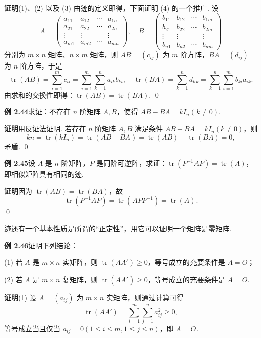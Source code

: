 \documentclass[UTF8,12pt,a4paper,fontset=fandol]{ctexart}
\begin{document}
\noindent\textbf{证明}\quad (1)、(2) 以及 (3) 由迹的定义即得，下面证明 (4) 的一个推广. 设
\[
A=
\left(
\begin{array}{cccc}
a_{11} & a_{12} & \cdots & a_{1n}\\
a_{21} & a_{22} & \cdots & a_{2n}\\
\vdots & \vdots & & \vdots\\
a_{m1} & a_{m2} & \cdots & a_{mn}
\end{array}
\right),\quad
B=
\left(
\begin{array}{cccc}
b_{11} & b_{12} & \cdots & b_{1m}\\
b_{21} & b_{22} & \cdots & b_{2m}\\
\vdots & \vdots & & \vdots\\
b_{n1} & b_{n2} & \cdots & b_{nm}
\end{array}
\right)
\]
分别为 $m\times n$ 矩阵、$n\times m$ 矩阵，则 $AB=(c_{ij})$ 为 $m$ 阶方阵，$BA=(d_{ij})$ 为 $n$ 阶方阵，于是
\[
\operatorname{tr}(AB)=\sum_{i=1}^m c_{ii}
=\sum_{i=1}^m\sum_{k=1}^n a_{ik}b_{ki},\quad
\operatorname{tr}(BA)=\sum_{k=1}^n d_{kk}
=\sum_{k=1}^n\sum_{i=1}^m b_{ki}a_{ik}.
\]
由求和的交换性即得：$\operatorname{tr}(AB)=\operatorname{tr}(BA)$. \qed

\noindent\textbf{例 2.44}\quad 求证：不存在 $n$ 阶矩阵 $A,B$，使得 $AB-BA=kI_n(k\ne0)$.

\noindent\textbf{证明}\quad 用反证法证明. 若存在 $n$ 阶矩阵 $A,B$ 满足条件 $AB-BA=kI_n(k\ne0)$，则
\[
kn=\operatorname{tr}(kI_n)=\operatorname{tr}(AB-BA)=\operatorname{tr}(AB)-\operatorname{tr}(BA)=0,
\]
矛盾. \qed

\noindent\textbf{例 2.45}\quad 设 $A$ 是 $n$ 阶矩阵，$P$ 是同阶可逆阵，求证：$\operatorname{tr}(P^{-1}AP)=\operatorname{tr}(A)$，即相似矩阵具有相同的迹.

\noindent\textbf{证明}\quad 因为 $\operatorname{tr}(AB)=\operatorname{tr}(BA)$，故
\[
\operatorname{tr}(P^{-1}AP)=\operatorname{tr}(APP^{-1})=\operatorname{tr}(A).
\]
\qed

迹还有一个基本性质是所谓的“正定性”，用它可以证明一个矩阵是零矩阵.

\noindent\textbf{例 2.46}\quad 证明下列结论：

(1) 若 $A$ 是 $m\times n$ 实矩阵，则 $\operatorname{tr}(AA')\ge0$，等号成立的充要条件是 $A=O$；

(2) 若 $A$ 是 $m\times n$ 复矩阵，则 $\operatorname{tr}(A\overline A')\ge0$，等号成立的充要条件是 $A=O$.

\noindent\textbf{证明}\quad (1) 设 $A=(a_{ij})$ 为 $m\times n$ 实矩阵，则通过计算可得
\[
\operatorname{tr}(AA')=\sum_{i=1}^m\sum_{j=1}^n a_{ij}^2\ge0,
\]
等号成立当且仅当 $a_{ij}=0(1\le i\le m,1\le j\le n)$，即 $A=O$.
\end{document}
